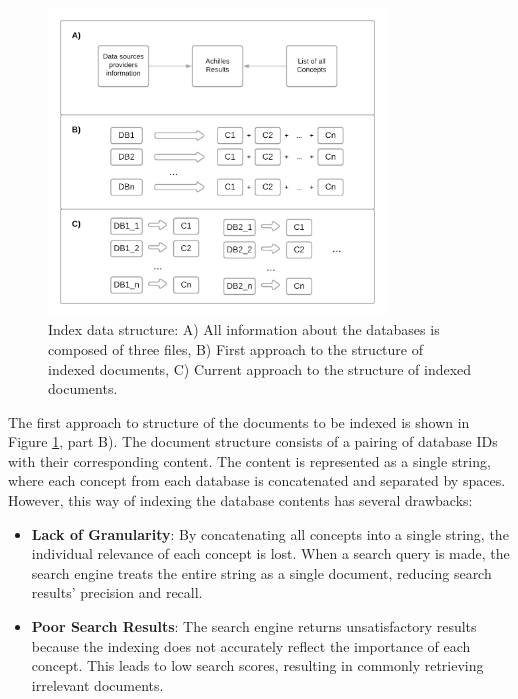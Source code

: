 \begin{figure}[H]
    \includegraphics[width=0.8\textwidth]{figs/chapter3/index_struct.png}
    \centering
    \caption{Index data structure: A) All information about the databases is composed of three files, B) First approach to the structure of indexed documents, C) Current approach to the structure of indexed documents.}
    \label{fig_struct}
\end{figure}


The first approach to structure of the documents to be indexed is shown in Figure \ref{fig_struct}, part B). The document structure consists of a pairing of database IDs with their corresponding content. The content is represented as a single string, where each concept from each database is concatenated and separated by spaces. However, this way of indexing the database contents has several drawbacks: 

\begin{itemize}
    \item \textbf{Lack of Granularity}: By concatenating all concepts into a single string, the individual relevance of each concept is lost. When a search query is made, the search engine treats the entire string as a single document, reducing search results' precision and recall.
    \item \textbf{Poor Search Results}: The search engine returns unsatisfactory results because the indexing does not accurately reflect the importance of each concept. This leads to low search scores, resulting in commonly retrieving irrelevant documents.
\end{itemize}

